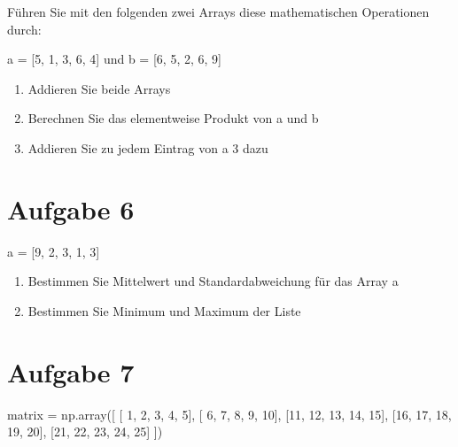 \documentclass[
  letterpaper,
  DIV=11,
  numbers=noendperiod]{scrreprt}
\newenvironment{Shaded}{\begin{snugshade}}{\end{snugshade}}
\newcommand{\DecValTok}[1]{\textcolor[rgb]{0.68,0.00,0.00}{#1}}
\newcommand{\NormalTok}[1]{\textcolor[rgb]{0.00,0.23,0.31}{#1}}
\newcommand{\OperatorTok}[1]{\textcolor[rgb]{0.37,0.37,0.37}{#1}}
\providecommand{\tightlist}{%
  \setlength{\itemsep}{0pt}\setlength{\parskip}{0pt}}\usepackage{longtable,booktabs,array}
\begin{document}

Führen Sie mit den folgenden zwei Arrays diese mathematischen
Operationen durch:

a = {[}5, 1, 3, 6, 4{]} und b = {[}6, 5, 2, 6, 9{]}

\begin{enumerate}
\def\labelenumi{\arabic{enumi}.}
\tightlist
\item
  Addieren Sie beide Arrays
\item
  Berechnen Sie das elementweise Produkt von a und b
\item
  Addieren Sie zu jedem Eintrag von a 3 dazu
\end{enumerate}

\section*{Aufgabe 6}\label{aufgabe-6}


a = {[}9, 2, 3, 1, 3{]}

\begin{enumerate}
\def\labelenumi{\arabic{enumi}.}
\tightlist
\item
  Bestimmen Sie Mittelwert und Standardabweichung für das Array a
\item
  Bestimmen Sie Minimum und Maximum der Liste
\end{enumerate}

\section*{Aufgabe 7}\label{aufgabe-7}


\begin{Shaded}
\begin{Highlighting}[]
\NormalTok{matrix }\OperatorTok{=}\NormalTok{ np.array([}
\NormalTok{    [ }\DecValTok{1}\NormalTok{,  }\DecValTok{2}\NormalTok{,  }\DecValTok{3}\NormalTok{,  }\DecValTok{4}\NormalTok{,  }\DecValTok{5}\NormalTok{],}
\NormalTok{    [ }\DecValTok{6}\NormalTok{,  }\DecValTok{7}\NormalTok{,  }\DecValTok{8}\NormalTok{,  }\DecValTok{9}\NormalTok{, }\DecValTok{10}\NormalTok{],}
\NormalTok{    [}\DecValTok{11}\NormalTok{, }\DecValTok{12}\NormalTok{, }\DecValTok{13}\NormalTok{, }\DecValTok{14}\NormalTok{, }\DecValTok{15}\NormalTok{],}
\NormalTok{    [}\DecValTok{16}\NormalTok{, }\DecValTok{17}\NormalTok{, }\DecValTok{18}\NormalTok{, }\DecValTok{19}\NormalTok{, }\DecValTok{20}\NormalTok{],}
\NormalTok{    [}\DecValTok{21}\NormalTok{, }\DecValTok{22}\NormalTok{, }\DecValTok{23}\NormalTok{, }\DecValTok{24}\NormalTok{, }\DecValTok{25}\NormalTok{]}
\NormalTok{])}
\end{Highlighting}
\end{Shaded}
\end{document}
